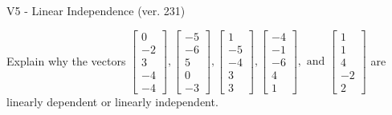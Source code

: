 \begin{exercise}
  \begin{exerciseTitle}V5 - Linear Independence (ver. 231)\end{exerciseTitle}
  \begin{exerciseStatement}
    Explain why the vectors \(\left[\begin{array}{r}
0 \\
-2 \\
3 \\
-4 \\
-4
\end{array}\right] , \left[\begin{array}{r}
-5 \\
-6 \\
5 \\
0 \\
-3
\end{array}\right] , \left[\begin{array}{r}
1 \\
-5 \\
-4 \\
3 \\
3
\end{array}\right] , \left[\begin{array}{r}
-4 \\
-1 \\
-6 \\
4 \\
1
\end{array}\right] , \text{ and } \left[\begin{array}{r}
1 \\
1 \\
4 \\
-2 \\
2
\end{array}\right]\) are linearly dependent or linearly independent.	



\end{exerciseStatement}
\end{exercise}
